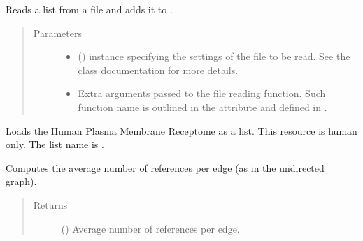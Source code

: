 \documentclass[letterpaper,10pt,english]{sphinxmanual}
\begin{document}
\begin{fulllineitems}
\begin{fulllineitems}
\label{\detokenize{reference:pypath.main.PyPath.read_list_file}}
Reads a list from a file and adds it to
.
\begin{quote}\begin{description}
\item[{Parameters}] \leavevmode\begin{itemize}
\item {} 
 () \textendash{}  instance specifying
the settings of the file to be read. See the class
documentation for more details.

\item {} 
 \textendash{} Extra arguments passed to the file reading function. Such
function name is outlined in the
 attribute and
defined in .

\end{itemize}

\end{description}\end{quote}

\end{fulllineitems}


\begin{fulllineitems}
\label{\detokenize{reference:pypath.main.PyPath.receptors_list}}
Loads the Human Plasma Membrane Receptome as a list. This
resource is human only.
The list name is .

\end{fulllineitems}


\begin{fulllineitems}
\label{\detokenize{reference:pypath.main.PyPath.reference_edge_ratio}}
Computes the average number of references per edge (as in the
undirected graph).
\begin{quote}\begin{description}
\item[{Returns}] \leavevmode
() \textendash{} Average number of references per edge.


\end{description}
\end{quote}
\end{fulllineitems}
\end{fulllineitems}
\end{document}
